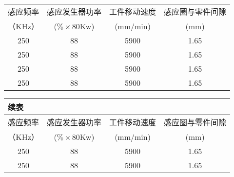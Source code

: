 \begin{table}[!htbp]
    \centering
    \begin{tabular}{cccc}
    \toprule
    感应频率 &感应发生器功率 & 工件移动速度  &感应圈与零件间隙\\
    （KHz）&($\% \times$80Kw) &(mm/min)  &(mm)\\
    \midrule
    250 &88 &5900 &1.65\\
    250 &88 &5900 &1.65\\
    250 &88 &5900 &1.65\\
    250 &88 &5900 &1.65\\
    \bottomrule
    \end{tabular}
\end{table}


\begin{table}
    \centering
    \begin{tabular}{cccc}
    \multicolumn{4}{l}{\textbf{续表}}
    \vspace{6pt}\\
    \toprule
    感应频率 &感应发生器功率 & 工件移动速度  &感应圈与零件间隙\\
    （KHz）&($\% \times$80Kw) &(mm/min)  &(mm)\\
    \midrule
    250 &88 &5900 &1.65\\
    250 &88 &5900 &1.65\\
    \bottomrule
    \end{tabular}
\end{table}
